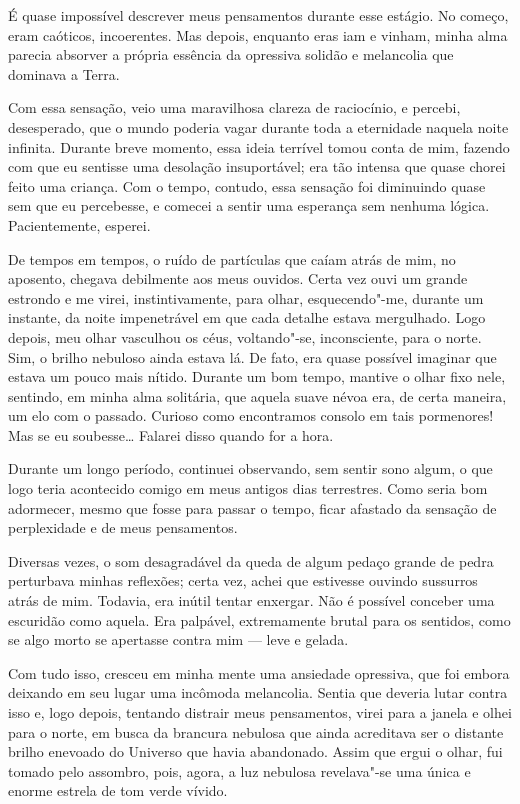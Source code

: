 É quase impossível descrever meus pensamentos durante esse estágio. No começo, eram caóticos, incoerentes. Mas depois,
enquanto eras iam e vinham, minha alma parecia absorver a própria essência da opressiva solidão e melancolia que
dominava a Terra. 

Com essa sensação, veio uma maravilhosa clareza de raciocínio, e percebi, desesperado, que o mundo poderia vagar
durante toda a eternidade naquela noite infinita. Durante breve momento, essa ideia terrível tomou conta de mim,
fazendo com que eu sentisse uma desolação insuportável; era tão intensa que quase chorei feito uma criança. Com o
tempo, contudo, essa sensação foi diminuindo quase sem que eu percebesse, e comecei a sentir uma esperança sem nenhuma
lógica. Pacientemente, esperei.

De tempos em tempos, o ruído de partículas que caíam atrás de mim, no aposento, chegava debilmente aos meus ouvidos.
Certa vez ouvi um grande estrondo e me virei, instintivamente, para olhar, esquecendo"-me, durante um instante, da noite
impenetrável em que cada detalhe estava mergulhado. Logo depois, meu olhar vasculhou os céus, voltando"-se,
inconsciente, para o norte. Sim, o brilho nebuloso ainda estava lá. De fato, era quase possível imaginar que estava
um pouco mais nítido. Durante um bom tempo, mantive o olhar fixo nele, sentindo, em minha alma solitária, que aquela
suave névoa era, de certa maneira, um elo com o passado. Curioso como encontramos consolo em tais pormenores! Mas se eu
soubesse\ldots{} Falarei disso quando for a hora.

Durante um longo período, continuei observando, sem sentir sono algum, o que logo teria acontecido comigo em meus
antigos dias terrestres. Como seria bom adormecer, mesmo que fosse para passar o tempo, ficar afastado da sensação de
perplexidade e de meus pensamentos.

Diversas vezes, o som desagradável da queda de algum pedaço grande de pedra perturbava minhas reflexões; certa vez,
achei que estivesse ouvindo sussurros atrás de mim. Todavia, era inútil tentar enxergar. Não é possível
conceber uma escuridão como aquela. Era palpável, extremamente brutal para os sentidos, como se algo morto se apertasse
contra mim --- leve e gelada.

Com tudo isso, cresceu em minha mente uma ansiedade opressiva, que foi embora deixando em seu lugar uma incômoda
melancolia. Sentia que deveria lutar contra isso e, logo depois, tentando distrair meus pensamentos, virei para a
janela e olhei para o norte, em busca da brancura nebulosa que ainda acreditava ser o distante brilho enevoado do
Universo que havia abandonado. Assim que ergui o olhar, fui tomado pelo assombro, pois, agora, a luz nebulosa
revelava"-se uma única e enorme estrela de tom verde vívido.

